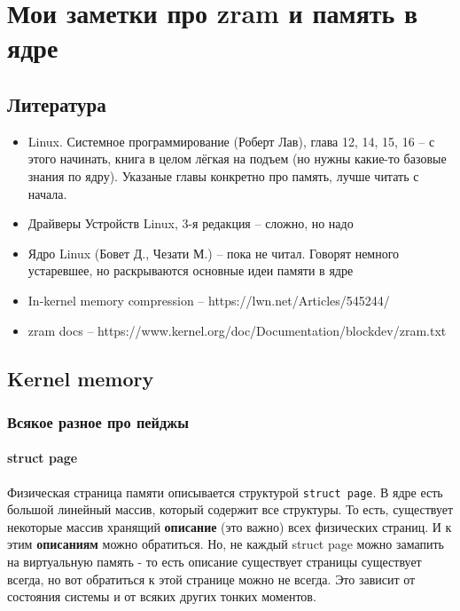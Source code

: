 \documentclass[12pt]{report}
\begin{document}

\chapter*{Мои заметки про zram и память в ядре}

\section*{Литература} 

\begin{itemize}
	\item Linux. Системное программирование (Роберт Лав), глава 12, 14, 15, 16 -- с этого начинать, книга в целом лёгкая на подъем (но нужны какие-то базовые знания по ядру). Указаные главы конкретно про память, лучше читать с начала.
	\item Драйверы Устройств Linux, 3-я редакция -- сложно, но надо
	\item Ядро Linux (Бовет Д., Чезати М.) -- пока не читал. Говорят немного устаревшее, но раскрываются основные идеи памяти в ядре
	\item In-kernel memory compression -- https://lwn.net/Articles/545244/
	\item zram docs -- https://www.kernel.org/doc/Documentation/blockdev/zram.txt
\end{itemize}

\section*{Kernel memory}


\subsection*{Всякое разное про пейджы} 

\subsubsection{struct page}

Физическая страница памяти описывается структурой \texttt{struct page}. В ядре есть большой линейный массив, который содержит все структуры. То есть, существует некоторые массив хранящий \textbf{описание} (это важно) всех физических страниц. И к этим \textbf{описаниям} можно обратиться. Но, не каждый struct page можно замапить на виртуальную память - то есть описание существует страницы существует всегда, но вот обратиться к этой странице можно не всегда. Это зависит от состояния системы и от всяких других тонких моментов. 
\end{document}
